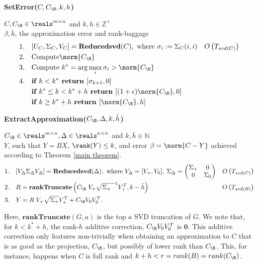 \begin{framed}
\begin{alg}\label{alg:seterr}
{\bf SetError($C, C_{\N}, k, h$) }
\end{alg}
 $C, C_{\N} \in \reals^{m \times n}$ and $k, h \in \mathbb{Z^+}$\\
 $\beta, \bar h$, the approximation error and rank-baggage
%
\begin{align*}
1. \quad& [U_C, \Sigma_C, V_C] = \textbf{Reducedsvd}(C), \text{ where } \sigma_i := \Sigma_C (i, i)  & O\left( T_{svd(C)} \right) \\
2. \quad& \text{Compute} \norm{C_{\N}}\\
3. \quad& \text{Compute } k^* = \arg \max_i \sigma_i > \norm{C_{\N}} \\
4. \quad& \textbf{if } k < k^* \textbf{ return } [\sigma_{k+1}, 0] \\
 \quad& \textbf{if } k^* \leq k < k^* + h \textbf{ return } [(1 + \epsilon) \norm{C_{\N}}, 0] \\
\quad& \textbf{if } k \geq k^* + h \textbf{ return } [\norm{C_{\N}}, h] 
\end{align*}
%
\end{framed}


\begin{framed}
\begin{alg}\label{alg:extractApprox}
{\bf ExtractApproximation($C_{\B}, \Delta, k, \bar h$) }
\end{alg}
 $C_{\B} \in \reals^{m \times n}, \Delta \in \reals^{n \times n}$ and $k, \bar h \in \mathbb{N}$\\
 $Y$, such that $Y=BX$, $\rank(Y) \leq k$, and error $\beta = \norm{C - Y}$ achieved according to Theorem \ref{main theorem}.
%
\begin{align*}
1. \quad& [V_{\Delta} \Sigma_{\Delta} V_{\Delta}] = \textbf{Reducedsvd} (\Delta),\text{ where } V_{\Delta} = [V_+, V_0],\; \Sigma_{\Delta} = \begin{pmatrix} \Sigma_+ & 0 \\ 0 & \Sigma_0 \end{pmatrix} & O\left(T_{svd(C)} \right)\\
2. \quad& R = \textbf{rankTruncate}\left( C_{\B} \; V_+ \sqrt{\Sigma_+}^{-1} V_+ ^T, k - \bar h \right)  & O\left( T_{svd(B)} \right)\\
3. \quad& Y = R \; V_+ \sqrt{\Sigma_+} V_+ ^T  + C_{\B} V_0 V_0 ^T.
\end{align*}
%
\end{framed}
\noindent Here, $\textbf{rankTruncate}(G, a)$ is the top $a$ SVD truncation of $G$. We note that, for $k < k^* + h$, the rank-$h$ additive correction, $C_{\B} V_0 V_0 ^T$ is $\mathbf{0}$. This additive correction only features non-trivially when obtaining an approximation to $C$ that is as good as the projection, $C_{\B}$, but possibly of lower rank than $C_{\B}$. This, for instance, happens when $C$ is full rank and $k + h < r = rank(B) = rank(C_{\B})$. 